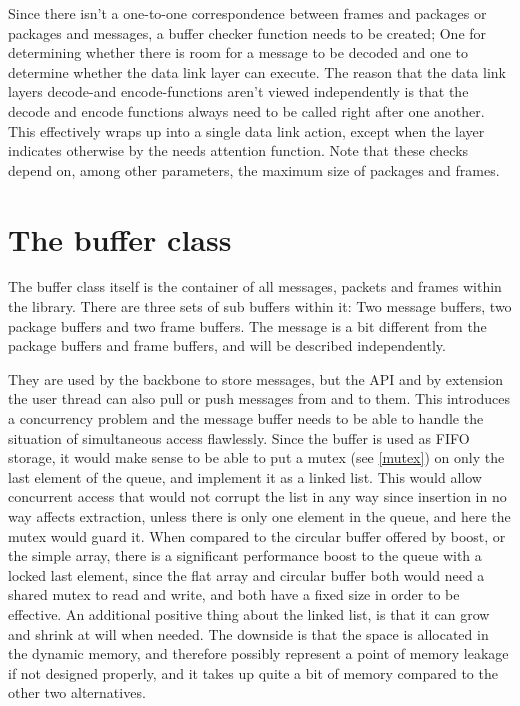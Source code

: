 Since there isn't a one-to-one correspondence between frames and packages or packages and messages, a buffer checker function needs to be created; One for determining whether there is room for a message to be decoded and one to determine whether the data link layer can execute. The reason that the data link layers decode-and encode-functions aren't viewed independently is that the decode and encode functions always need to be called right after one another. This effectively wraps up into a single data link action, except when the layer indicates otherwise by the needs attention function.
Note that these checks depend on, among other parameters, the maximum size of packages and frames.





\section{The buffer class}
The buffer class itself is the container of all messages, packets and frames within the library. There are three sets of sub buffers within it: Two message buffers, two package buffers and two frame buffers. 
The message is a bit different from the package buffers and frame buffers, and will be described independently. 

They are used by the backbone to store messages, but the API and by extension the user thread can also pull or push messages from and to them. This introduces a concurrency problem and the message buffer needs to be able to handle the situation of simultaneous access flawlessly.
Since the buffer is used as FIFO storage, it would make sense to be able to put a mutex (see \ref{mutex}) on only the last element of the queue, and implement it as a linked list.
This would allow concurrent access that would not corrupt the list in any way since insertion in no way affects extraction, unless there is only one element in the queue, and here the mutex would guard it.
When compared to the circular buffer offered by boost, or the simple array, there is a significant performance boost to the queue with a locked last element, since the flat array and circular buffer both would need a shared mutex to read and write, and both have a fixed size in order to be effective.
An additional positive thing about the linked list, is that it can grow and shrink at will when needed. The downside is that the space is allocated in the dynamic memory, and therefore possibly represent a point of memory leakage if not designed properly, and it takes up quite a bit of memory compared to the other two alternatives.

